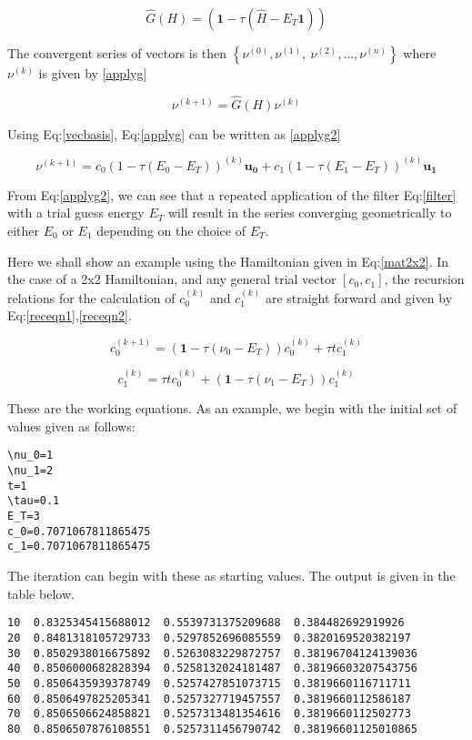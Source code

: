 \documentclass[11pt]{article}
\begin{document}
\begin{equation}
\label{filter}
\hat{G}(H) = \left ( \mathbf{1} - \tau (\hat{H} - E_T\mathbf{1}) \right)
\end{equation}

The convergent series of vectors is then \(\left\{ \nu^{(0)},  \nu^{(1)},\
\nu^{(2)},\dots,\nu^{(n)}\right\}\) where \(\nu^{(k)}\) is given by \ref{applyg}

\begin{equation}
\label{applyg}
\nu^{(k+1)} = \hat{G}(H)\nu^{(k)}
\end{equation}

Using Eq:\ref{vecbasis}, Eq:\ref{applyg} can be written as \ref{applyg2}

\begin{equation}
\label{applyg2}
\nu^{(k+1)} = c_0 (1-\tau(E_0-E_T))^{(k)}\mathbf{u_0} + c_1 (1-\tau(E_1-E_T))^{(k)}\mathbf{u_1}
\end{equation}

From Eq:\ref{applyg2}, we can see that a repeated application of the filter Eq:\ref{filter}
with a trial guess energy \(E_T\) will result in the series converging
geometrically to either \(E_0\) or \(E_1\) depending on the choice of \(E_T\).

Here we shall show an example using the Hamiltonian given in Eq:\ref{mat2x2}. In the
case of a 2x2 Hamiltonian, and any general trial vector \([c_0,c_1]\), the
recursion relations for the calculation of \(c^{(k)}_0\) and \(c^{(k)}_1\) are
straight forward and given by Eq:\ref{receqn1},\ref{receqn2}.

\begin{equation}
\label{receqn1}
c^{(k+1)}_0 =  \left(\mathbf{1}-\tau\left(\nu_0 - E_T\right)\right)c^{(k)}_0 + \tau t c^{(k)}_1
\end{equation}

\begin{equation}
\label{receqn2}
c^{(k)}_1 = \tau t c^{(k)}_0 + \left(\mathbf{1}-\tau\left(\nu_1 - E_T\right)\right)c^{(k)}_1
\end{equation}

These are the working equations. As an example, we begin with the initial set of
values given as follows:

\begin{verbatim}
\nu_0=1
\nu_1=2
t=1
\tau=0.1
E_T=3
c_0=0.7071067811865475
c_1=0.7071067811865475
\end{verbatim}

The iteration can begin with these as starting values. The output is given in
the table below.

\begin{verbatim}
10	0.8325345415688012	0.5539731375209688	0.384482692919926
20	0.8481318105729733	0.5297852696085559	0.3820169520382197
30	0.8502938016675892	0.5263083229872757	0.38196704124139036
40	0.8506000682828394	0.5258132024181487	0.38196603207543756
50	0.8506435939378749	0.5257427851073715	0.3819660116711711
60	0.8506497825205341	0.5257327719457557	0.3819660112586187
70	0.8506506624858821	0.5257313481354616	0.3819660112502773
80	0.8506507876108551	0.5257311456790742	0.38196601125010865
\end{verbatim}
\end{document}
